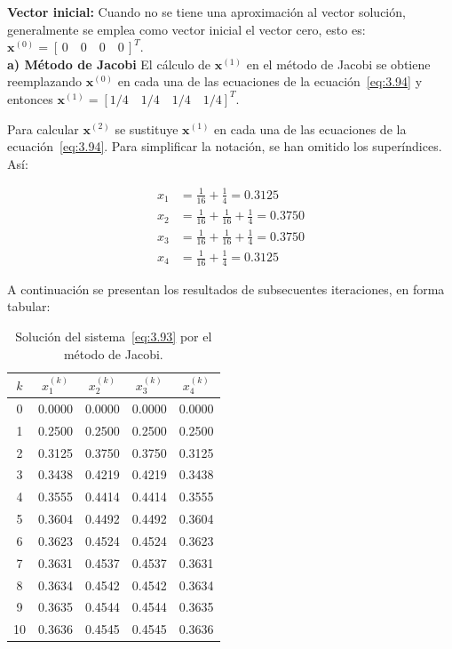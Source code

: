 \documentclass[12pt,letterpaper]{article}
\theoremstyle{definition}
\theoremstyle{plain}
\theoremstyle{remark}
\begin{document}
\textbf{Vector inicial:} Cuando no se tiene una aproximación al vector solución, generalmente se emplea como vector inicial el vector cero, esto es: \(\mathbf{x}^{(0)} = [\,0 \quad 0 \quad 0 \quad 0\,]^T\).\\

\textbf{a) Método de Jacobi} El cálculo de $\mathbf{x}^{(1)}$ en el método de Jacobi se obtiene reemplazando $\mathbf{x}^{(0)}$ en cada una de las ecuaciones de la ecuación~\eqref{eq:3.94} y entonces $\mathbf{x}^{(1)} = [1/4 \quad 1/4 \quad 1/4 \quad 1/4]^T$.

Para calcular $\mathbf{x}^{(2)}$ se sustituye $\mathbf{x}^{(1)}$ en cada una de las ecuaciones de la ecuación~\eqref{eq:3.94}. Para simplificar la notación, se han omitido los superíndices. Así:

\[
\begin{aligned}
x_1 &= \frac{1}{16} + \frac{1}{4} = 0.3125 \\
x_2 &= \frac{1}{16} + \frac{1}{16} + \frac{1}{4} = 0.3750 \\
x_3 &= \frac{1}{16} + \frac{1}{16} + \frac{1}{4} = 0.3750 \\
x_4 &= \frac{1}{16} + \frac{1}{4} = 0.3125
\end{aligned}
\]

A continuación se presentan los resultados de subsecuentes iteraciones, en forma tabular:

\begin{table}[h!]
\centering
\caption{Solución del sistema~\eqref{eq:3.93} por el método de Jacobi.}
\begin{tabular}{c|c c c c}
$k$ & $x_1^{(k)}$ & $x_2^{(k)}$ & $x_3^{(k)}$ & $x_4^{(k)}$ \\
\hline
0 & 0.0000 & 0.0000 & 0.0000 & 0.0000 \\
1 & 0.2500 & 0.2500 & 0.2500 & 0.2500 \\
2 & 0.3125 & 0.3750 & 0.3750 & 0.3125 \\
3 & 0.3438 & 0.4219 & 0.4219 & 0.3438 \\
4 & 0.3555 & 0.4414 & 0.4414 & 0.3555 \\
5 & 0.3604 & 0.4492 & 0.4492 & 0.3604 \\
6 & 0.3623 & 0.4524 & 0.4524 & 0.3623 \\
7 & 0.3631 & 0.4537 & 0.4537 & 0.3631 \\
8 & 0.3634 & 0.4542 & 0.4542 & 0.3634 \\
9 & 0.3635 & 0.4544 & 0.4544 & 0.3635 \\
10 & 0.3636 & 0.4545 & 0.4545 & 0.3636
\end{tabular}
\end{table}
\end{document}

